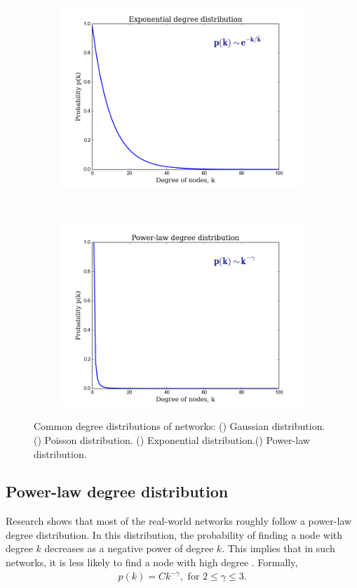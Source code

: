 \documentclass[10pt,a4paper]{article}
\begin{document}
\begin{figure}[H]
\begin{subfigure}[b]{0.45\textwidth}
		\includegraphics[width=\textwidth]{images/exp.png}
		\caption{}
		\label{expo}
	\end{subfigure}~
	\begin{subfigure}[b]{0.45\textwidth}
		\includegraphics[width=\textwidth]{images/p-law.png}
		\caption{}
		\label{powerlaw}
	\end{subfigure}
	\caption{Common degree distributions of networks: () Gaussian distribution. () Poisson distribution. () Exponential distribution.() Power-law distribution.}
	\label{distribution}
\end{figure} 

\subsection{Power-law degree distribution}
Research shows that most of the real-world networks roughly follow a power-law degree distribution. In this distribution, the probability of finding a node with degree $k$ decreases as a negative power of degree $k$. This implies that in such networks, it is less likely to find a node with high degree \citep{estrada2011structure}.
Formally,
\begin{eqnarray}
p(k) = C k^{-\gamma}, \text{ for } 2 \leq  \gamma \leq  3.
\label{eqn:power-law}
\end{eqnarray}
\end{document}
